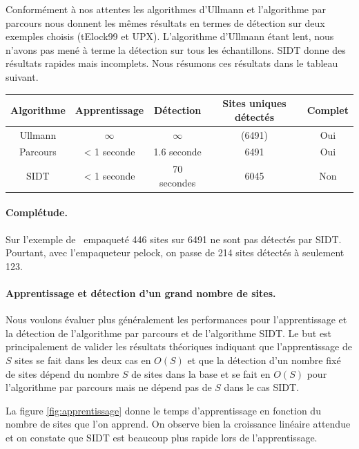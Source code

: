 Conformément à nos attentes les algorithmes d'Ullmann et l'algorithme par parcours nous donnent les mêmes résultats en termes de détection sur deux exemples choisis (tElock99 et UPX). L'algorithme d'Ullmann étant lent, nous n'avons pas mené à terme la détection sur tous les échantillons.
SIDT donne des résultats rapides mais incomplets. Nous résumons ces résultats dans le tableau suivant.

\begin{center}
\begin{tabular}{|c|c|c|c|c|}
\hline
 Algorithme & Apprentissage & Détection & Sites uniques détectés & Complet \\
 \hline
 Ullmann & $\infty$ & $\infty$ & (6491) & Oui\\
 Parcours & < 1 seconde & 1.6 seconde & 6491 & Oui\\
 SIDT & < 1 seconde & 70 secondes & 6045 & Non\\
 \hline
\end{tabular}
\end{center}

\paragraph{Complétude.}
Sur l'exemple de \hostname\ empaqueté 446 sites sur 6491 ne sont pas détectés par SIDT.
Pourtant, avec l'empaqueteur pelock, on passe de 214 sites détectés à seulement 123.



\paragraph{Apprentissage et détection d'un grand nombre de sites.}
Nous voulons évaluer plus généralement les performances pour l'apprentissage et la détection de l'algorithme par parcours et de l'algorithme SIDT.
Le but est principalement de valider les résultats théoriques indiquant que l'apprentissage de $S$ sites se fait dans les deux cas en $O(S)$ et que la détection d'un nombre fixé de sites dépend du nombre $S$ de sites dans la base et se fait en $O(S)$ pour l'algorithme par parcours mais ne dépend pas de $S$ dans le cas SIDT.

La figure \ref{fig:apprentissage} donne le temps d'apprentissage en fonction du nombre de sites que l'on apprend.
On observe bien la croissance linéaire attendue et on constate que SIDT est beaucoup plus rapide lors de l'apprentissage.

